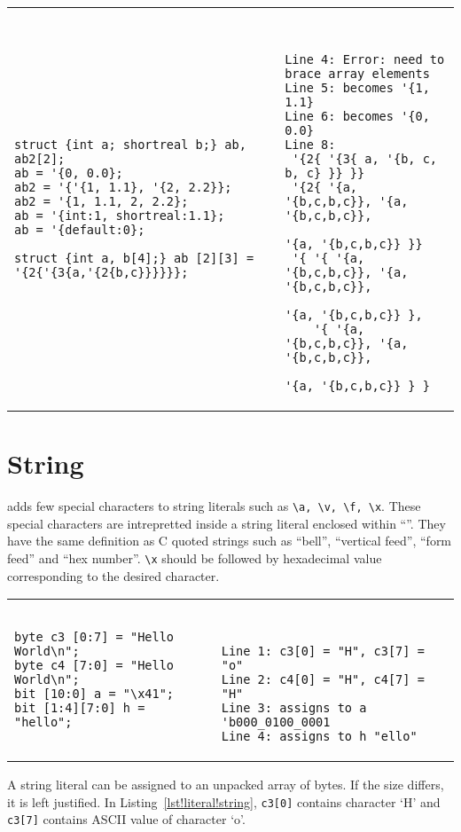 \begin{table}
\begin{tabular}{p{} p{}}
\begin{lstlisting}[label=lst!literal!struct, caption=Structure Literals]
struct {int a; shortreal b;} ab, ab2[2];
ab = '{0, 0.0};
ab2 = '{'{1, 1.1}, '{2, 2.2}};
ab2 = '{1, 1.1, 2, 2.2};
ab = '{int:1, shortreal:1.1};
ab = '{default:0};

struct {int a, b[4];} ab [2][3] = '{2{'{3{a,'{2{b,c}}}}}};
\end{lstlisting}
&
\begin{tbldesc}
\begin{verbatim}


Line 4: Error: need to brace array elements
Line 5: becomes '{1, 1.1}
Line 6: becomes '{0, 0.0}
Line 8:
 '{2{ '{3{ a, '{b, c, b, c} }} }}
 '{2{ '{a, '{b,c,b,c}}, '{a, '{b,c,b,c}},
                      '{a, '{b,c,b,c}} }}
 '{ '{ '{a, '{b,c,b,c}}, '{a, '{b,c,b,c}},
                      '{a, '{b,c,b,c}} },
    '{ '{a, '{b,c,b,c}}, '{a, '{b,c,b,c}},
                      '{a, '{b,c,b,c}} } }
\end{verbatim}
\end{tbldesc}
\end{tabular}
\end{table}

\section{String}
\lsvlog adds few special characters to string literals such as
\texttt{\textbackslash{}a, \textbackslash{}v, \textbackslash{}f,
  \textbackslash{}x}. These special characters are intrepretted inside
a string literal enclosed within ``''. They have the same definition
as C quoted strings such as ``bell'', ``vertical feed'', ``form feed''
and ``hex number''. \texttt{\textbackslash{}x} should be followed by
hexadecimal value corresponding to the desired character.

\begin{table}
\begin{tabular}{p{} p{}}
\begin{lstlisting}[label=lst!literal!string, caption=String Literal
    Examples]
byte c3 [0:7] = "Hello World\n";
byte c4 [7:0] = "Hello World\n";
bit [10:0] a = "\x41";
bit [1:4][7:0] h = "hello";
\end{lstlisting}
&
\begin{tbldesc}
\begin{verbatim}


Line 1: c3[0] = "H", c3[7] = "o"
Line 2: c4[0] = "H", c4[7] = "H"
Line 3: assigns to a 'b000_0100_0001
Line 4: assigns to h "ello"
\end{verbatim}
\end{tbldesc}
\end{tabular}
\end{table}

A string literal can be assigned to an unpacked array of bytes. If the
size differs, it is left justified. In
Listing~\ref{lst!literal!string}, \texttt{c3[0]} contains character
`H' and \texttt{c3[7]} contains ASCII value of character `o'.
